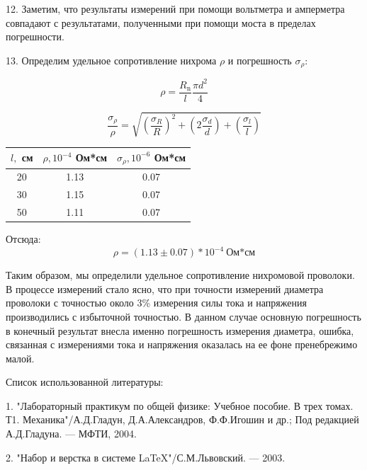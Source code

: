 \documentclass[14pt]{article}
\begin{document}
	
	\vspace{0.5cm}
	12. Заметим, что результаты измерений при помощи вольтметра и амперметра совпадают с результатами, полученными при помощи
	моста в пределах погрешности.
	
	\vspace{0.5cm}
	13. Определим удельное сопротивление нихрома $\rho$ и погрешность $\sigma_\rho$:
	
	$$\rho = \frac{R_\text{n}}{l}\frac{\pi d^2}{4}$$
	
	$$\frac{\sigma_\rho}{\rho} = \sqrt{\left(\frac{\sigma_R}{R}\right)^2 + \left(2\frac{\sigma_d}{d}\right) + 
	\left(\frac{\sigma_l}{l}\right)}$$	
	
	\vspace{0.5cm}
	\begin{center}
	\begin{tabular}{|c|c|c|}
	\hline
	$l,$ см 	& $\rho, 10^{-4}$ Ом*см 	& $\sigma_\rho, 10^{-6}$ Ом*см\\
	\hline
	20			& 1.13 						& 0.07\\
	\hline
	30			& 1.15						& 0.07\\
	\hline
	50			& 1.11						& 0.07\\ 
	\hline
	\end{tabular}
	\end{center}
	
	\vspace{1cm}
	Отсюда:	
	$$\boxed{\boxed{\rho = (1.13 \pm 0.07)*10^{-4}~\text{Ом*см}}}$$
	
	\vspace{1cm}
	Таким образом, мы определили удельное сопротивление нихромовой проволоки. В процессе измерений стало ясно, что при точности
	измерений диаметра проволоки с точностью около 3\% измерения силы тока и напряжения производились с избыточной точностью. В данном 
	случае основную погрешность в конечный результат внесла именно погрешность измерения диаметра, ошибка, связанная с измерениями
	тока и напряжения оказалась на ее фоне пренебрежимо малой.
	
	\newpage
	Список использованной литературы:
	
	\vspace{0.5cm}
	1. "Лабораторный практикум по общей физике: Учебное пособие. В трех томах. Т1. Механика"/А.Д.Гладун, Д.А.Александров,
	Ф.Ф.Игошин и др.; Под редакцией А.Д.Гладуна. --- МФТИ, 2004.
	
	2. "Набор и верстка в системе \LaTeX "/С.М.Львовский. --- 2003.
	
\end{document}
